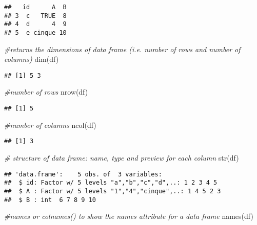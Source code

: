 \documentclass[
]{article}
\newenvironment{Shaded}{\begin{snugshade}}{\end{snugshade}}
\newcommand{\CommentTok}[1]{\textcolor[rgb]{0.56,0.35,0.01}{\textit{#1}}}
\newcommand{\FunctionTok}[1]{\textcolor[rgb]{0.00,0.00,0.00}{#1}}
\newcommand{\NormalTok}[1]{#1}
\begin{document}
\begin{verbatim}
##   id      A  B
## 3  c   TRUE  8
## 4  d      4  9
## 5  e cinque 10
\end{verbatim}

\begin{Shaded}
\begin{Highlighting}[]
\CommentTok{\#returns the dimensions of data frame (i.e. number of rows and number of columns)}
\FunctionTok{dim}\NormalTok{(df) }
\end{Highlighting}
\end{Shaded}

\begin{verbatim}
## [1] 5 3
\end{verbatim}

\begin{Shaded}
\begin{Highlighting}[]
\CommentTok{\#number of rows}
\FunctionTok{nrow}\NormalTok{(df) }
\end{Highlighting}
\end{Shaded}

\begin{verbatim}
## [1] 5
\end{verbatim}

\begin{Shaded}
\begin{Highlighting}[]
\CommentTok{\#number of columns}
\FunctionTok{ncol}\NormalTok{(df) }
\end{Highlighting}
\end{Shaded}

\begin{verbatim}
## [1] 3
\end{verbatim}

\begin{Shaded}
\begin{Highlighting}[]
\CommentTok{\# structure of data frame: name, type and preview for each column}
\FunctionTok{str}\NormalTok{(df) }
\end{Highlighting}
\end{Shaded}

\begin{verbatim}
## 'data.frame':    5 obs. of  3 variables:
##  $ id: Factor w/ 5 levels "a","b","c","d",..: 1 2 3 4 5
##  $ A : Factor w/ 5 levels "1","4","cinque",..: 1 4 5 2 3
##  $ B : int  6 7 8 9 10
\end{verbatim}

\begin{Shaded}
\begin{Highlighting}[]
\CommentTok{\#names or colnames() to show the names attribute for a data frame}
\FunctionTok{names}\NormalTok{(df) }
\end{Highlighting}
\end{Shaded}
\end{document}
